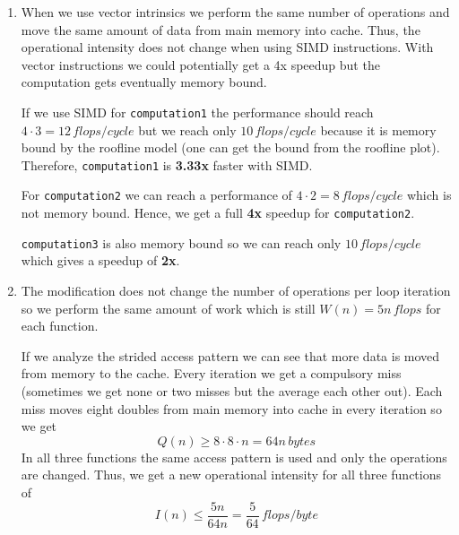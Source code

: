 \documentclass[a4paper]{article}
\begin{document}
\begin{enumerate}
\begin{enumerate}
            \item When we use vector intrinsics we perform the same number of
                operations and move the same amount of data from main memory
                into cache. Thus, the operational intensity does not change
                when using SIMD instructions. With vector instructions we could 
                potentially get a 4x speedup but the computation gets eventually 
                memory bound.

                If we use SIMD for \verb|computation1| the performance should
                reach $4 \cdot 3 = 12 \, flops/cycle$ but we reach only $10
                \, flops/cycle$ because it is memory bound by the roofline
                model (one can get the bound from the roofline plot). 
                Therefore, \verb|computation1| is \textbf{3.33x} faster
                with SIMD.

                For \verb|computation2| we can reach a performance of $4 \cdot
                2 = 8 \, flops/cycle$ which is not memory bound. Hence, we get
                a full \textbf{4x} speedup for \verb|computation2|.

                \verb|computation3| is also memory bound so we can reach only
                $10 \, flops/cycle$ which gives a speedup of \textbf{2x}. 
            
            \item The modification does not change the number of operations per
                loop iteration so we perform the same 
                amount of work which is still $W(n) = 5n \, flops$ for each
                function.

                If we analyze the strided access pattern we can see that more
                data is moved from memory to the cache. Every iteration we get
                a compulsory miss (sometimes we get none or two misses but the
                average each other out). Each miss moves eight doubles from
                main memory into cache in every iteration so we get
                \begin{equation*}
                    Q(n) \geq 8 \cdot 8 \cdot n = 64n \, bytes
                \end{equation*}
                In all three functions the same access pattern is used and only
                the operations are changed. Thus, we get a new operational
                intensity for all three functions of
                \begin{equation*}
                    I(n) \leq \frac{5n}{64n} = \frac{5}{64} \, flops/byte 
                \end{equation*}


\end{enumerate}
\end{enumerate}
\end{document}
